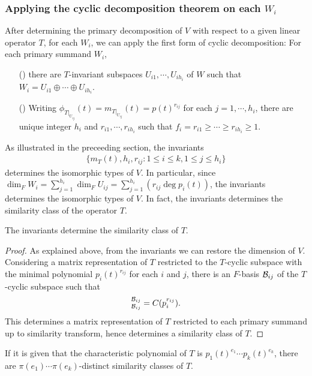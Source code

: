 \subsubsection*{Applying the cyclic decomposition theorem on each $W_i$}
After determining the primary decomposition of $V$ with respect to a given linear operator $T$, for each $W_i$, we can apply the first form of cyclic decomposition: For each primary summand $W_i$,
\begin{enumerate}
    \item[(\romannumeral 1)]
    {
        there are $T$-invariant subspaces $U_{i 1}, \cdots, U_{i h_i}$ of $W$ such that $W_i = U_{i 1}\oplus\cdots\oplus U_{i h_i}$.
        }
    \item[(\romannumeral 2)]
    {
        Writing $\phi_{T|_{U_{i j}}}(t)=m_{T|_{U_{i j}}}(t)=p(t)^{r_{i j}}$ for each $j=1, \cdots, h_i$,  there are unique integer $h_i$ and $r_{i 1}, \cdots, r_{i h_i}$ such that $f_i=r_{i 1}\geq\cdots\geq r_{i h_i}\geq 1$.
    }
\end{enumerate}
As illustrated in the preceeding section, the invariants
\begin{align*}
    \{m_T(t), h_i, r_{ij}: 1\leq i\leq k, 1\leq j\leq h_i\}
\end{align*}
determines the isomorphic types of $V$.
In particular, since $\dim_F W_i=\sum_{j=1}^{h_i}\dim_F U_{ij}=\sum_{j=1}^{h_i}(r_{ij}\deg p_i(t))$, the invariants determines the isomorphic types of $V$.
In fact, the invariants determines the similarity class of the operator $T$.
\begin{prop}
    The invariants determine the similarity class of $T$.
\end{prop}
\begin{proof}
    As explained above, from the invariants we can restore the dimension of $V$.
    Considering a matrix representation of $T$ restricted to the $T$-cyclic subspace with the minimal polynomial $p_i(t)^{r_{ij}}$ for each $i$ and $j$, there is an $F$-basis ${\mathcal{B}}_{i j}$ of the $T$-cyclic subspace such that
    \begin{align*}
        [T|_{U_{i j}}]^{\mc{B}_{i j}}_{\mc{B}_{i j}}=C(p_i^{r_{i j}}).
    \end{align*}
    This determines a matrix representation of $T$ restricted to each primary summand up to similarity transform, hence determines a similarity class of $T$.
\end{proof}
\begin{cor}
    If it is given that the characteristic polynomial of $T$ is $p_1(t)^{e_1}\cdots p_k(t)^{e_k}$, there are $\pi(e_1)\cdots\pi(e_k)$-distinct similarity classes of $T$.
\end{cor}

